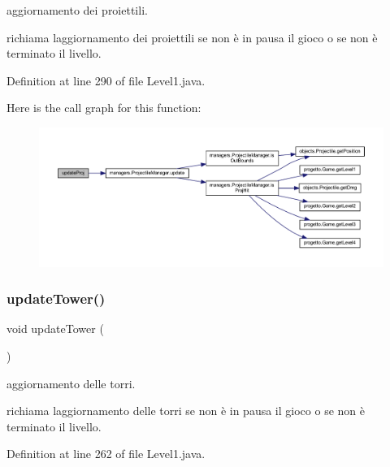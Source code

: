 aggiornamento dei proiettili. 

richiama l\textquotesingle{}aggiornamento dei proiettili se non è in pausa il gioco o se non è terminato il livello. 

Definition at line 290 of file Level1.\+java.

Here is the call graph for this function\+:\nopagebreak
\begin{figure}[H]
\begin{center}
\leavevmode
\includegraphics[width=350pt]{classscenes_1_1_level1_ac83c203b559f6fd0bb225744d7ccf854_cgraph}
\end{center}
\end{figure}
\mbox{\label{classscenes_1_1_level1_ae4fd4a959e4d782a5e7ac0eff77ba27f}} 
\subsubsection{\texorpdfstring{update\+Tower()}{updateTower()}}
{\footnotesize\ttfamily void update\+Tower (\begin{DoxyParamCaption}{ }\end{DoxyParamCaption})}



aggiornamento delle torri. 

richiama l\textquotesingle{}aggiornamento delle torri se non è in pausa il gioco o se non è terminato il livello. 

Definition at line 262 of file Level1.\+java.

